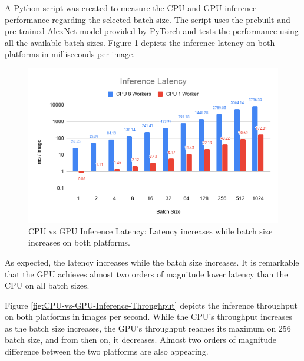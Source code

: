 A Python script was created to measure the CPU and GPU inference performance regarding the selected batch size. The script uses the prebuilt and pre-trained AlexNet model provided by PyTorch and tests the performance using all the available batch sizes. Figure \ref{fig:CPU-vs-GPU-Inference-Latency} depicts the inference latency on both platforms in milliseconds per image.

\begin{figure} [H]
	\centering
	\includegraphics[width=\textwidth]{../Images/Results/CPU-GPU-Inference-Latency.png}
	\decoRule
	\caption[CPU vs GPU Inference Latency]{CPU vs GPU Inference Latency: Latency increases while batch size increases on both platforms.}
	\label{fig:CPU-vs-GPU-Inference-Latency}
\end{figure}

As expected, the latency increases while the batch size increases. It is remarkable that the GPU achieves almost two orders of magnitude lower latency than the CPU on all batch sizes.

Figure \ref{fig:CPU-vs-GPU-Inference-Throughput} depicts the inference throughput on both platforms in images per second. While the CPU's throughput increases as the batch size increases, the GPU's throughput reaches its maximum on 256 batch size, and from then on, it decreases. Almost two orders of magnitude difference between the two platforms are also appearing.

